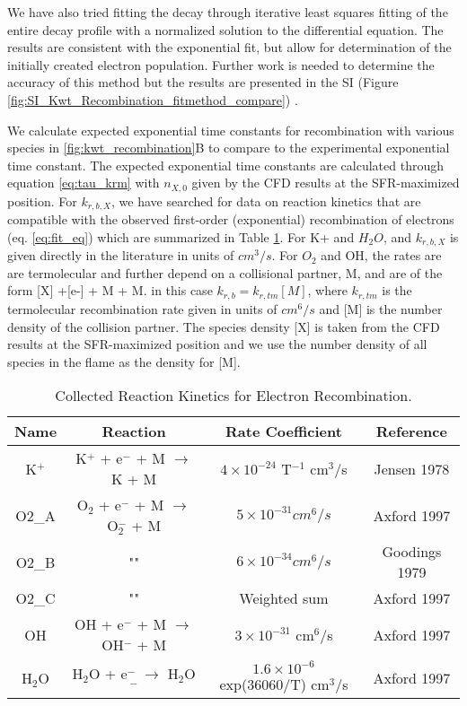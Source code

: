 We have also tried fitting the decay through iterative least squares fitting of the entire decay profile with a normalized solution to the differential equation. The results are consistent with the exponential fit, but allow for determination of the initially created electron population. Further work is needed to determine the accuracy of this method but the results are presented in the SI (Figure \ref*{fig:SI_Kwt_Recombination_fitmethod_compare}) .

We calculate expected exponential time constants for recombination with various species in \ref{fig:kwt_recombination}B to compare to the experimental exponential time constant. The expected exponential time constants are calculated through equation \ref{eq:tau_krm} with $n_{X,0}$ given by the CFD results at the SFR-maximized position. For $k_{r,b,X}$, we have searched for data on reaction kinetics that are compatible with the observed first-order (exponential) recombination of electrons (eq. \ref{eq:fit_eq}) which are summarized in Table \ref{tab:reactions}. For K+ and $H_2O$, and $k_{r,b,X}$ is given directly in the literature in units of $cm^3/s$. For $O_2$ and OH, the rates are are termolecular and further depend on a collisional partner, M, and are of the form [X] +[e-] + M \rightarrow [X-] + M. in this case $k_{r,b} = k_{r,tm} [M]$, where $k_{r,tm}$ is the termolecular recombination rate given in units of $cm^6/s$ and [M] is the number density of the collision partner.  The species density [X] is taken from the CFD results at the SFR-maximized position and we use the number density of all species in the flame as the density for [M]. 


\begin{table}[h]
\centering
\caption{Collected Reaction Kinetics for Electron Recombination.}
\label{tab:reactions}
\begin{tabular}{|c|c|c|c|}
\hline
Name & Reaction & Rate Coefficient & Reference \\
\hline
K$^+$ & K$^+$ + e$^-$ + M $\rightarrow$ K + M & $4 \times 10^{-24}$ T$^{-1}$ cm$^3$/s & Jensen 1978 \\
\hline
O2\_A & O$_2$ + e$^-$ + M $\rightarrow$ O$_2^-$ + M & $5 \times 10^{-31} cm^6/s$ & Axford 1997 \\
\hline
O2\_B & ""                                          & $6 \times 10^{-34} cm^6/s$ &  Goodings 1979 \\
\hline
O2\_C & ""                                          & Weighted sum  &  Axford 1997 \\
\hline
OH & OH + e$^-$ + M $\rightarrow$ OH$^-$ + M & $3 \times 10^{-31}$ cm$^6$/s & Axford 1997 \\
\hline
H$_2$O & H$_2$O + e$^-$ $\rightarrow$ H$_2$O$^-$ & $1.6 \times 10^{-6}$ exp(36060/T) cm$^3$/s & Axford 1997 \\
\hline
\end{tabular}
\end{table}

